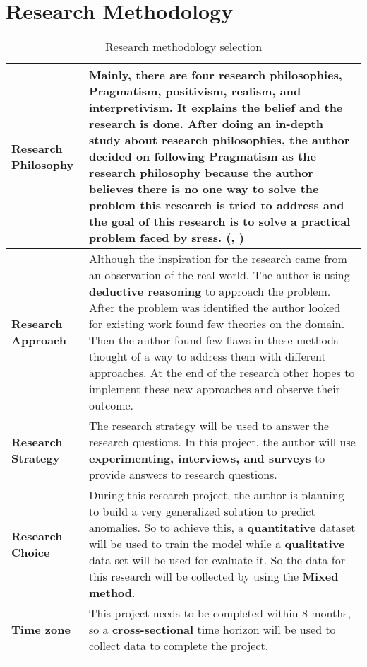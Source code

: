 \section{Research Methodology}


\begin{longtable}{|p{35mm}|p{125mm}|}
\hline
  \textbf{Research Philosophy} & 
  Mainly, there are four research philosophies, Pragmatism, positivism, realism, and interpretivism. It explains the belief and the research is done. After doing an in-depth study about research philosophies, the author decided on following \textbf{Pragmatism} as the research philosophy because the author believes there is no one way to solve the problem this research is tried to address and the goal of this research is to solve a practical problem faced by \acp{sres}. (\cite{1Philoso75:online}, \cite{Pragmati87:online})
  \\ \hline
  
  \textbf{Research Approach} & 
  Although the inspiration for the research came from an observation of the real world. The author is using \textbf{deductive reasoning} to approach the problem. After the problem was identified the author looked for existing work found few theories on the domain. Then the author found few flaws in these methods thought of a way to address them with different approaches. At the end of the research other hopes to implement these new approaches and observe their outcome.
  \\ \hline
  
  \textbf{Research Strategy} & 
  The research strategy will be used to answer the research questions. In this project, the author will use \textbf{experimenting, interviews, and surveys} to provide answers to research questions.
  \\ \hline
  
  \textbf{Research Choice} & 
  During this research project, the author is planning to build a very generalized solution to predict anomalies.  So to achieve this, a \textbf{quantitative} dataset will be used to train the model while a \textbf{qualitative} data set will be used for evaluate it. So the data for this research will be collected by using the \textbf{Mixed method}.
  \\ \hline
  
  \textbf{Time zone} & 
  This project needs to be completed within 8 months, so a \textbf{cross-sectional} time horizon will be used to collect data to complete the project.
  \\ \hline
  \caption{Research methodology selection}
\end{longtable}
